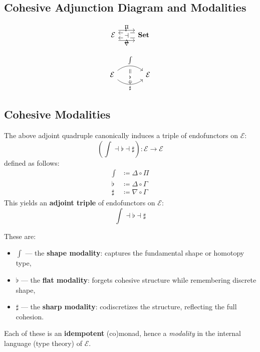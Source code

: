 \documentclass{article}
\begin{document}
\subsection{Cohesive Adjunction Diagram and Modalities}

\[
\begin{tikzcd}
\mathcal{E}
  \arrow[r, shift left=3, "\Pi"]
  \arrow[r, shift right=3, "\nabla"']
  \arrow[r, phantom, "\dashv" description]
  & \mathbf{Set}
  \arrow[l, shift left=1.5, "\Delta"]
  \arrow[l, shift right=1.5, "\Gamma"']
  \arrow[l, phantom, "\dashv" description]
\end{tikzcd}
\]

\[
\begin{tikzcd}[column sep=large]
\mathcal{E}
  \arrow[r, bend left=40, "\int", ""{name=s, below}]
  \arrow[r, bend right=40, "\sharp"'{name=t}]
  & \mathcal{E}
  \arrow[Rightarrow, from=s, to=t, "\flat" description]
\end{tikzcd}
\]


\newpage
\subsection{Cohesive Modalities}

The above adjoint quadruple canonically induces a triple of endofunctors on $\mathcal{E}$:
\[
(\int \dashv \flat \dashv \sharp) : \mathcal{E} \to \mathcal{E}
\]
defined as follows:
\begin{align*}
\int &\coloneqq \Delta \circ \Pi \\
\flat &\coloneqq \Delta \circ \Gamma \\
\sharp &\coloneqq \nabla \circ \Gamma
\end{align*}
This yields an \textbf{adjoint triple} of endofunctors on $\mathcal{E}$:
\[
\int \dashv \flat \dashv \sharp
\]

These are:
\begin{itemize}
  \item $\int$ — the \textbf{shape modality}: captures the fundamental shape or homotopy type,
  \item $\flat$ — the \textbf{flat modality}: forgets cohesive structure while remembering discrete shape,
  \item $\sharp$ — the \textbf{sharp modality}: codiscretizes the structure, reflecting the full cohesion.
\end{itemize}

Each of these is an \textbf{idempotent} (co)monad, hence a \emph{modality} in the internal language (type theory) of $\mathcal{E}$.
\end{document}
